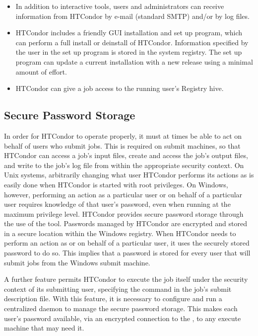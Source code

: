 \begin{itemize}
\item In addition to interactive tools, users and administrators can receive
information from HTCondor by e-mail (standard SMTP) and/or by log files.

\item HTCondor includes a friendly GUI installation and set up program,
which can perform a full install or deinstall of HTCondor.
Information specified by the user in the set up program is stored in the
system registry.  
The set up program can update a current installation with a
new release using a minimal amount of effort.

\item HTCondor can give a job access to the running user's Registry hive.

\end{itemize}

\subsection{\label{sec:windows-sps}Secure Password Storage}

In order for HTCondor to operate properly, it must at times be able to
act on behalf of users who submit jobs.  
This is required on submit machines,
so that HTCondor can access a job's input files, 
create and access the job's output files, 
and write to the job's log file from within the appropriate security context.
On Unix systems, arbitrarily changing what user HTCondor performs its
actions as is easily done when HTCondor is started with root privileges.
On Windows, however, performing an action as a particular user
or on behalf of a particular user requires knowledge of that user's password,
even when running at the maximum privilege level.
HTCondor provides secure password storage through the use of the 
 tool.
Passwords managed by HTCondor are encrypted and stored 
in a secure location within the Windows registry.
When HTCondor needs to perform an action as or on behalf of a particular user,
it uses the securely stored password to do so.
This implies that a password is stored for every user that will
submit jobs from the Windows submit machine.

A further feature permits HTCondor to execute the job itself under the
security context of its submitting user, specifying 
the  command in the job's
submit description file. 
With this feature, 
it is necessary to configure and run a centralized  daemon
to manage the secure password storage.
This makes each user's password available, via an encrypted
connection to the , to any execute machine that may need it.

